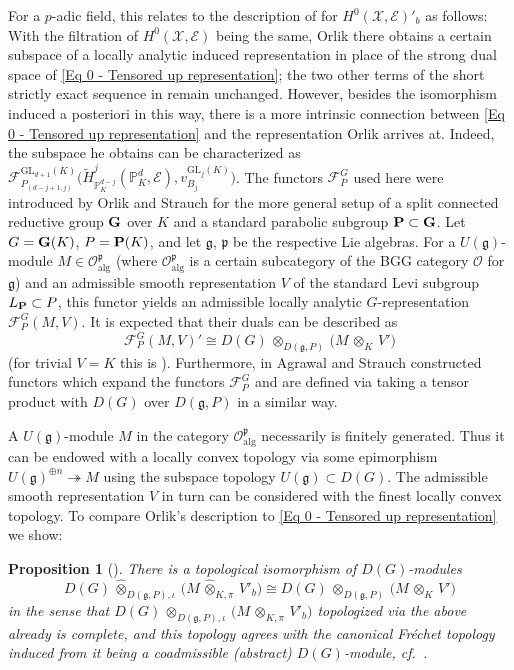 \documentclass[a4paper, reqno, 10pt]{amsart}
\newtheorem{propositionalphabetical}[theoremalphabetical]{Proposition}
\theoremstyle{definition}
\numberwithin{equation}{section}
\newcommand{\botimes}[1]{{\,\otimes_{#1}\,}}
\newcommand{\cotimes}[1]{{\,\widehat{\otimes}_{#1}\,}}
\newcommand{\GL}{{\mathrm{GL}}}
\newcommand{\projotimes}{{\,\otimes_{K,\pi}\,}}
\newcommand{\projcotimes}{{\,\widehat{\otimes}_{K,\pi}\,}}
\newcommand{\BP}{{\mathbb {P}}}
\newcommand{\CE}{{\mathcal {E}}}
\newcommand{\CF}{{\mathcal {F}}}
\newcommand{\CO}{{\mathcal {O}}}
\newcommand{\CX}{{\mathcal {X}}}
\newcommand{\bG}{{\mathrm{\bf G}}}
\newcommand{\bP}{{\mathrm{\bf P}}}
\newcommand{\Fg}{{\mathfrak {g}}}
\newcommand{\Fp}{{\mathfrak {p}}}
\newcommand{\alg}{{\mathrm{alg}}}
\begin{document}
For a $p$-adic field, this relates to the description of \cite[Thm.\ 1]{Orlik08EquivVBDrinfeldUpHalfSp} for $H^0(\CX,\CE)'_b$ as follows:
With the filtration of $H^0(\CX,\CE)$ being the same, Orlik there obtains a certain subspace of a locally analytic induced representation in place of the strong dual space of \eqref{Eq 0 - Tensored up representation}; the two other terms of the short strictly exact sequence in  remain unchanged.
However, besides the isomorphism induced a posteriori in this way, there is a more intrinsic connection between \eqref{Eq 0 - Tensored up representation} and the representation Orlik arrives at.
Indeed, the subspace he obtains can be characterized as $\CF^{\GL_{d+1}(K)}_{P_{(d-j+1,j)}} \big( \widetilde{H}^{j}_{\BP_K^{d-j}} (\BP_K^d, \CE) , v^{\GL_{j}(K)}_{B_{j}} \big)$.
The functors $\CF^G_P$ used here were introduced by Orlik and Strauch \cite{OrlikStrauch15JordanHoelderSerLocAnRep} for the more general setup of a split connected reductive group $\bG$ over $K$ and a standard parabolic subgroup $\bP \subset \bG$.
Let $G = \bG(K)$, $P = \bP(K)$, and let $\Fg$, $\Fp$ be the respective Lie algebras.
For a $U(\Fg)$-module $M \in \CO_\alg^\Fp$ (where $\CO_\alg^\Fp$ is a certain subcategory of the BGG category $\CO$ for $\Fg$) and an admissible smooth representation $V$ of the standard Levi subgroup $L_\bP \subset P$, this functor yields an admissible locally analytic $G$-representation $\CF^G_P(M,V)$.
It is expected that their duals can be described as 
\[\CF^G_P(M,V)' \cong D(G) \botimes{D(\Fg,P)} \big( M \botimes{K} V' \big) \]
(for trivial $V=K$ this is \cite[Prop.\ 3.7]{OrlikStrauch15JordanHoelderSerLocAnRep}). 
Furthermore, in \cite{AgrawalStrauch22FromCatOLocAnRep} Agrawal and Strauch constructed functors which expand the functors $\CF^G_P$ and are defined via taking a tensor product with $D(G)$ over $D(\Fg,P)$ in a similar way.


A $U(\Fg)$-module $M$ in the category $\CO_\alg^\Fp$ necessarily is finitely generated.
Thus it can be endowed with a locally convex topology via some epimorphism $U(\Fg)^{\oplus n} \twoheadrightarrow M$ using the subspace topology $U(\Fg) \subset D(G)$.
The admissible smooth representation $V$ in turn can be considered with the finest locally convex topology.
To compare Orlik's description to \eqref{Eq 0 - Tensored up representation} we show: 


\begin{propositionalphabetical}[{}]
	There is a topological isomorphism of $D(G)$-modules
	\begin{equation*}
		D(G) \cotimes{D(\Fg,P),\iota} \big( M \projcotimes V'_b \big) \cong D(G) \botimes{D(\Fg,P)} \big( M \botimes{K} V' \big) 
	\end{equation*}
	in the sense that $D(G) \botimes{D(\Fg,P),\iota} \big( M \projotimes V'_b \big)$ topologized via the above already is complete, and this topology agrees with the canonical Fr\'echet topology induced from it being a coadmissible (abstract) $D(G)$-module, cf.\ \cite{AgrawalStrauch22FromCatOLocAnRep}.
\end{propositionalphabetical}
\end{document}
